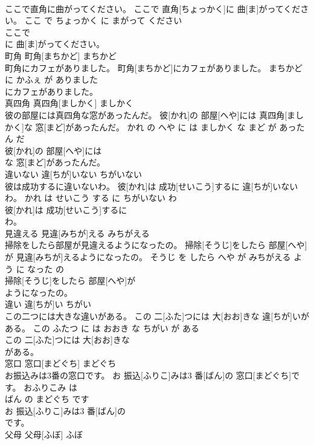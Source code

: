 \documentclass[8pt]{extreport}
\begin{document}
\begin{CJK}{UTF8}{min}
\\	ここで直角に曲がってください。	ここで 直角[ちょっかく]に 曲[ま]がってください。	ここ で ちょっかく に まがって ください	
\\	ここで
\\	に 曲[ま]がってください。			
\\	町角	町角[まちかど]	まちかど	
\\	町角にカフェがありました。	町角[まちかど]にカフェがありました。	まちかど に かふぇ が ありました	
\\	にカフェがありました。			
\\	真四角	真四角[ましかく]	ましかく	
\\	彼の部屋には真四角な窓があったんだ。	彼[かれ]の 部屋[へや]には 真四角[ましかく]な 窓[まど]があったんだ。	かれ の へや に は ましかく な まど が あった ん だ	
\\	彼[かれ]の 部屋[へや]には
\\	な 窓[まど]があったんだ。			
\\	違いない	違[ちが]いない	ちがいない	
\\	彼は成功するに違いないわ。	彼[かれ]は 成功[せいこう]するに 違[ちが]いないわ。	かれ は せいこう する に ちがいない わ	
\\	彼[かれ]は 成功[せいこう]するに
\\	わ。			
\\	見違える	見違[みちが]える	みちがえる	
\\	掃除をしたら部屋が見違えるようになったの。	掃除[そうじ]をしたら 部屋[へや]が 見違[みちが]えるようになったの。	そうじ を したら へや が みちがえる よう に なった の	
\\	掃除[そうじ]をしたら 部屋[へや]が
\\	ようになったの。			
\\	違い	違[ちが]い	ちがい	
\\	この二つには大きな違いがある。	この 二[ふた]つには 大[おお]きな 違[ちが]いがある。	この ふたつ に は おおき な ちがい が ある	
\\	この 二[ふた]つには 大[おお]きな
\\	がある。			
\\	窓口	窓口[まどぐち]	まどぐち	
\\	お振込みは3番の窓口です。	お 振込[ふりこ]みは3 番[ばん]の 窓口[まどぐち]です。	おふりこみ は 
\\	ばん の まどぐち です	
\\	お 振込[ふりこ]みは3 番[ばん]の
\\	です。			
\\	父母	父母[ふぼ]	ふぼ	

\end{CJK}
\end{document}

